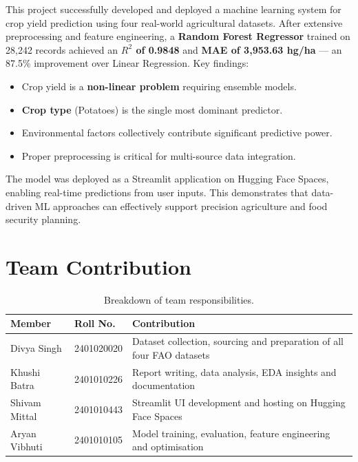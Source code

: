 \documentclass[12pt,a4paper]{article}
\begin{document}
This project successfully developed and deployed a machine learning system for
crop yield prediction using four real-world agricultural datasets. After extensive
preprocessing and feature engineering, a \textbf{Random Forest Regressor} trained
on 28,242 records achieved an \textbf{$R^2$ of 0.9848} and \textbf{MAE of 3,953.63 hg/ha}
--- an 87.5\% improvement over Linear Regression. Key findings:

\begin{itemize}[leftmargin=2em]
  \item Crop yield is a \textbf{non-linear problem} requiring ensemble models.
  \item \textbf{Crop type} (Potatoes) is the single most dominant predictor.
  \item Environmental factors collectively contribute significant predictive power.
  \item Proper preprocessing is critical for multi-source data integration.
\end{itemize}

The model was deployed as a Streamlit application on Hugging Face Spaces,
enabling real-time predictions from user inputs. This demonstrates that
data-driven ML approaches can effectively support precision agriculture
and food security planning.

\section*{Team Contribution}

\begin{table}[H]
\centering
\caption{Breakdown of team responsibilities.}
\renewcommand{\arraystretch}{1.5}
\begin{tabularx}{\textwidth}{L{3.5cm} L{3cm} X}
\toprule
{}
\color{white}\textbf{Member} &
\color{white}\textbf{Roll No.} &
\color{white}\textbf{Contribution} \\
\midrule
{}
Divya Singh   & 2401020020 & Dataset collection, sourcing and preparation of all four FAO datasets \\
Khushi Batra  & 2401010226 & Report writing, data analysis, EDA insights and documentation \\
Shivam Mittal & 2401010443 & Streamlit UI development and hosting on Hugging Face Spaces \\
Aryan Vibhuti & 2401010105 & Model training, evaluation, feature engineering and optimisation \\
\bottomrule
\end{tabularx}
\end{table}
\end{document}

